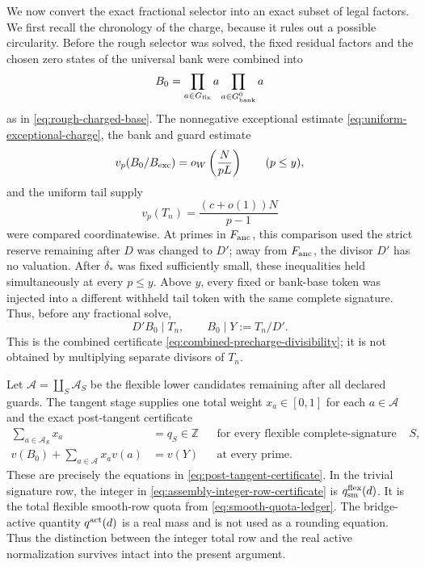 \documentclass[11pt]{article}
\numberwithin{equation}{section}
\theoremstyle{definition}
\theoremstyle{remark}
\newcommand{\1}{\mathbf 1}
\begin{document}
We now convert the exact fractional selector into an exact subset of legal
factors.  We first recall the chronology of the charge, because it rules
out a possible circularity.  Before the rough selector was solved, the
fixed residual factors and the chosen zero states of the universal bank
were combined into
\begin{equation}
 B_0=
 \prod_{a\in G_{\rm fix}}a
 \prod_{a\in G_{\rm bank}^0}a
 \label{eq:assembly-base-product}
\end{equation}
as in \eqref{eq:rough-charged-base}.  The nonnegative exceptional estimate
\eqref{eq:uniform-exceptional-charge}, the bank and guard estimate
\[
 v_p(B_0/B_{\rm exc})=o_W\left(\frac{N}{pL}\right)
 \qquad(p\le y),
\]
and the uniform tail supply
\[
 v_p(T_n)=\frac{(c+o(1))N}{p-1}
\]
were compared coordinatewise.  At primes in \(F_{\rm anc}\), this
comparison used the strict reserve remaining after \(D\) was changed to
\(D'\); away from \(F_{\rm anc}\), the divisor \(D'\) has no valuation.
After \(\delta_*\) was fixed sufficiently small, these inequalities held
simultaneously at every \(p\le y\).  Above \(y\), every fixed or bank-base
token was injected into a different withheld tail token with the same
complete signature.  Thus, before any fractional solve,
\begin{equation}
                         D'B_0\mid T_n,\qquad
                         B_0\mid Y:=T_n/D'.
 \label{eq:assembly-pre-solve-divisibility}
\end{equation}
This is the combined certificate
\eqref{eq:combined-precharge-divisibility}; it is not obtained by
multiplying separate divisors of \(T_n\).

Let \(\mathcal A=\coprod_S\mathcal A_S\) be the flexible lower candidates
remaining after all declared guards.  The tangent stage supplies one total
weight \(x_a\in[0,1]\) for each \(a\in\mathcal A\) and the exact
post-tangent certificate
\begin{align}
 \sum_{a\in\mathcal A_S}x_a&=q_S\in\mathbb Z
       &&\text{for every flexible complete-signature row }S,
 \label{eq:assembly-integer-row-certificate}\\
 v(B_0)+\sum_{a\in\mathcal A}x_av(a)&=v(Y)
       &&\text{at every prime}.
 \label{eq:assembly-valuation-certificate}
\end{align}
These are precisely the equations in
\eqref{eq:post-tangent-certificate}.  In the trivial signature row, the
integer in \eqref{eq:assembly-integer-row-certificate} is
\(q_{\rm sm}^{\rm flex}(d)\).  It is the total flexible smooth-row quota
from \eqref{eq:smooth-quota-ledger}.  The bridge-active quantity
\(q^{\rm act}(d)\) is a real mass and is not used as a rounding equation.
Thus the distinction between the integer total row and the real active
normalization survives intact into the present argument.
\end{document}
